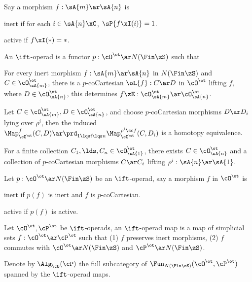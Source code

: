 \documentclass[a4paper, twoside]{article}
\begin{document}
\begin{dfn}[2.1.1.8, 2.1.2.1]
    Say a morphism $f:\sA{m}\ar\sA{n}$ is
    \begin{enr}[label=(\arabic*)]
        \item inert if for each $i\in\sA{n}\xC$, $\sP{f\xI(i)}=1$.
        \item active if $f\xI(*)=*$.
    \end{enr}
\end{dfn}

\begin{dfn}[2.1.1.10]
    An $\ift$-operad is a functor $p:\cO^{\ot}\ar N(\Fin\zS)$ such that
    \begin{enr}[label=(\arabic*)]
        \item For every inert morphism $f:\sA{m}\ar\sA{n}$ in $N(\Fin\zS)$ and $C\in\cO^{\ot}_{\sA{m}}$, there is a $p$-coCartesian $\oL{f}:C\ar D$ in $\cO^{\ot}$ lifting $f$, where $D\in\cO^{\ot}_{\sA{n}}$, this determines $f\zE:\cO_{\sA{m}}^{\ot}\ar\cO_{\sA{n}}^{\ot}$.
        \item Let $C\in\cO_{\sA{m}}^{\ot},D\in\cO_{\sA{n}}^{\ot}$, and choose $p$-coCartesian morphisms $D\ar D_{i}$ lying over $\rho^{i}$, then the induced $\Map_{\cO^{\ot}}^{f}(C,D)\ar\prd_{1\lqs i\lqs n}\Map_{\cO^{\ot}}^{\rho^{i}\cc f}(C,D_{i})$ is a homotopy equivalence.
        \item For a finite collection $C_{1},\lds,C_{n}\in\cO_{\sA{1}}^{\ot}$, there exists $C\in\cO_{\sA{n}}^{\ot}$ and a collection of $p$-coCartesian morphisms $C\ar C_{i}$ lifting $\rho^{i}:\sA{n}\ar\sA{1}$.
    \end{enr}
\end{dfn}

\begin{dfn}[2.1.2.3]
    Let $p:\cO^{\ot}\ar N(\Fin\zS)$ be an $\ift$-operad, say a morphism $f$ in $\cO^{\ot}$ is
    \begin{enr}[label=(\arabic*)]
        \item inert if $p(f)$ is inert and $f$ is $p$-coCartesian.
        \item active if $p(f)$ is active.
    \end{enr}
\end{dfn}

\begin{dfn}[2.1.2.7]
    Let $\cO^{\ot},\cP^{\ot}$ be $\ift$-operads, an $\ift$-operad map is a map of simplicial sets $f:\cO^{\ot}\ar\cP^{\ot}$ such that (1) $f$ preserves inert morphisms, (2) $f$ commutes with $\cO^{\ot}\ar N(\Fin\zS)$ and $\cP^{\ot}\ar N(\Fin\zS)$.

    Denote by $\Alg_{\cO}(\cP)$ the full subcategory of $\Fun_{N(\Fin\zS)}(\cO^{\ot},\cP^{\ot})$ spanned by the $\ift$-operad maps.
\end{dfn}
\end{document}
